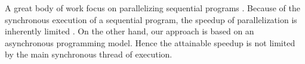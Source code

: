 A great body of work focus on parallelizing sequential programs \cite{Banerjee2013,Li2012,Matsakis2012a,Radoi2014}. %
Because of the synchronous execution of a sequential program, the speedup of parallelization is inherently limited \cite{Amdahl1967,Gunther2008}.
On the other hand, our approach is based on an asynchronous programming model.
Hence the attainable speedup is not limited by the main synchronous thread of execution.



